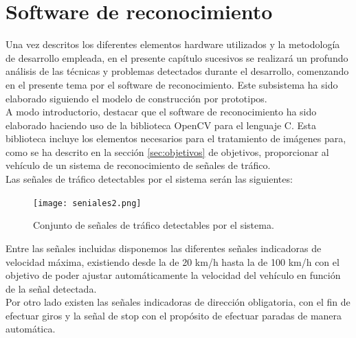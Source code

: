 

\chapter{Software de reconocimiento}
\label{chap:reconocimiento}

Una vez descritos los diferentes elementos hardware utilizados y la metodología de desarrollo empleada, en el presente capítulo  sucesivos se realizará un profundo análisis de las técnicas y problemas detectados durante el desarrollo, comenzando en el presente tema por el software de reconocimiento. Este subsistema ha sido elaborado siguiendo el modelo de construcción por prototipos.\\

A modo introductorio, destacar que el software de reconocimiento ha sido elaborado haciendo uso de la biblioteca OpenCV para el lenguaje C. Esta biblioteca incluye los elementos necesarios para el tratamiento de imágenes para, como se ha descrito en la sección \ref{sec:objetivos} de objetivos, proporcionar al vehículo de un sistema de reconocimiento de señales de tráfico.\\

Las señales de tráfico detectables por el sistema serán las siguientes:\\

\begin{figure}[H]
  \begin{center}
    \texttt{[image: seniales2.png]}
  \end{center}
  \caption{Conjunto de señales de tráfico detectables por el sistema.}
  \label{conjunto-señales-rp}
\end{figure}

Entre las señales incluidas disponemos las diferentes señales indicadoras de velocidad máxima, existiendo desde la de 20 km/h hasta la de 100 km/h con el objetivo de poder ajustar automáticamente la velocidad del vehículo en función de la señal detectada.\\

Por otro lado existen las señales indicadoras de dirección obligatoria, con el fin de efectuar giros y la señal de stop con el propósito de efectuar paradas de manera automática.\\

